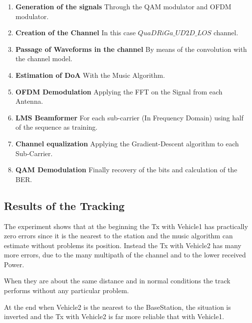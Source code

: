 \begin{enumerate}
    \item \textbf{Generation of the signals} Through the QAM modulator and OFDM modulator. 
    \item \textbf{Creation of the Channel} In this case $QuaDRiGa\_UD2D\_LOS$ channel.
    \item \textbf{Passage of Waveforms in the channel} By means of the convolution with the channel model.
    \item \textbf{Estimation of DoA} With the Music Algorithm.
    \item \textbf{OFDM Demodulation} Applying the FFT on the Signal from each Antenna.
    \item \textbf{LMS Beamformer} For each sub-carrier (In Frequency Domain) using half of the sequence as training.
    \item \textbf{Channel equalization} Applying the Gradient-Descent algorithm to each Sub-Carrier.
    \item \textbf{QAM Demodulation} Finally recovery of the bits and calculation of the BER.
\end{enumerate}


\subsection{Results of the Tracking}

The experiment shows that at the beginning the Tx with Vehicle1 has practically zero errors since it is the nearest to the station
and the music algorithm can estimate without problems its position. Instead the Tx with Vehicle2 has many more errors, due to 
the many multipath of the channel and to the lower received Power.

When they are about the same distance and in normal conditions the track performs without any particular problem.

At the end when Vehicle2 is the nearest to the BaseStation, the situation is inverted and the Tx with Vehicle2 is far more 
reliable that with Vehicle1.

